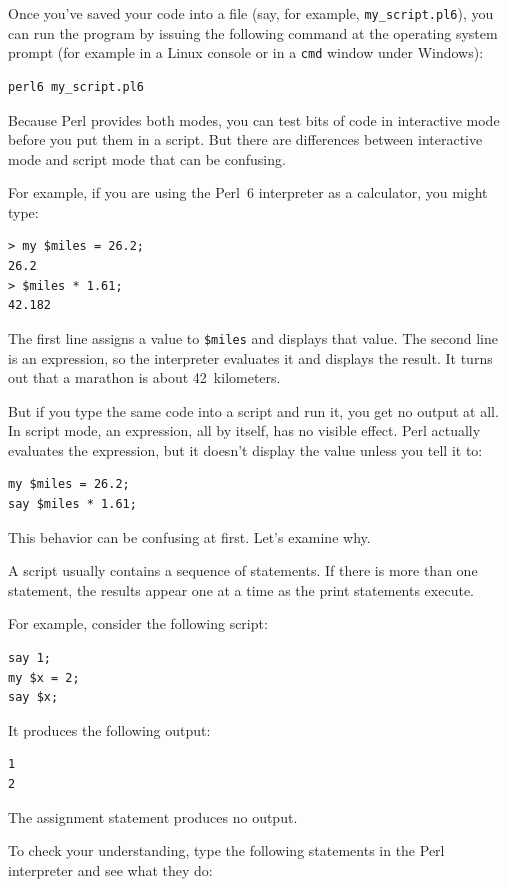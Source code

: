 Once you've saved your code into a file (say, for example, 
\verb'my_script.pl6'), you can run the program by issuing 
the following command at the operating system prompt (for example 
in a Linux console or in a \verb'cmd' window under Windows):
\begin{verbatim}
perl6 my_script.pl6
\end{verbatim}

Because Perl provides both modes,
you can test bits of code in interactive mode before you put them
in a script.  But there are differences between interactive mode
and script mode that can be confusing.

For example, if you are using the Perl~6 interpreter as a 
calculator, you might type:

\begin{verbatim}
> my $miles = 26.2;
26.2
> $miles * 1.61;
42.182
\end{verbatim}

The first line assigns a value to {\tt \$miles} and displays that value.  
The second line is an expression, so the
interpreter evaluates it and displays the result.  It turns out that a
marathon is about 42~kilometers.

But if you type the same code into a script and run it, you get no
output at all.  In script mode, an expression, all by itself, has no
visible effect.  Perl actually evaluates the expression, but it doesn't
display the value unless you tell it to:

\begin{verbatim}
my $miles = 26.2;
say $miles * 1.61;
\end{verbatim}

This behavior can be confusing at first. Let's examine why.

A script usually contains a sequence of statements.  If there
is more than one statement, the results appear one at a time
as the print statements execute.

For example, consider the following script:

\begin{verbatim}
say 1;
my $x = 2;
say $x;
\end{verbatim}
%
It produces the following output:

\begin{verbatim}
1
2
\end{verbatim}
%
The assignment statement produces no output.

To check your understanding, type the following statements in the
Perl interpreter and see what they do:


